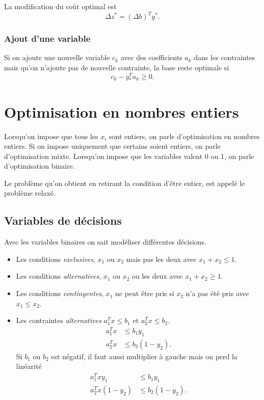 La modification du coût optimal est
\[ \Delta z^* = (\Delta b)^T y^*. \]

\subsubsection{Ajout d'une variable}
Si on ajoute une nouvelle variable $c_k$ avec des coefficients $a_k$ dans
les contraintes mais qu'on n'ajoute pas de nouvelle contrainte,
la base reste optimale si
\[ c_k-y_*^Ta_k \geq 0. \]

\section{Optimisation en nombres entiers}
Lorsqu'on impose que tous les $x_i$ sont entiers, on parle d'optimisation
en nombres entiers.
Si on impose uniquement que certains soient entiers, on parle d'optimisation
mixte.
Lorsqu'on impose que les variables valent 0 ou 1,
on parle d'optimisation binaire.

Le problème qu'on obtient en retirant la condition d'être entier,
est appelé le problème relaxé.

\subsection{Variables de décisions}
Avec les variables binaires on sait modéliser
différentes décisions.
\begin{itemize}
  \item Les conditions \emph{exclusives}, $x_1$ ou $x_2$ mais pas les deux
    avec $x_1 + x_2 \leq 1$.
  \item Les conditions \emph{alternatives}, $x_1$ ou $x_2$ ou les deux
    avec $x_1 + x_2 \geq 1$.
  \item Les conditions \emph{contingentes}, $x_1$ ne peut être pris si
    $x_2$ n'a pas été pris avec $x_1 \leq x_2$.
  \item Les contraintes \emph{alternatives} $a_1^Tx \leq b_1$ et
    $a_2^Tx \leq b_2$.
    \begin{align*}
      a_1^Tx & \leq b_1y_1\\
      a_2^Tx & \leq b_2(1-y_2).
    \end{align*}
    Si $b_1$ ou $b_2$ est négatif, il faut aussi multiplier à gauche mais
    on perd la linéarité
    \begin{align*}
      a_1^Txy_1 & \leq b_1y_1\\
      a_2^Tx(1-y_2) & \leq b_2(1-y_2).
    \end{align*}
\end{itemize}

